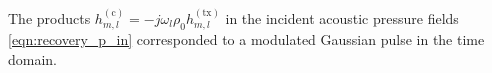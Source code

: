 %
%
%
%
The products
$h_{m, l}^{(\text{c})} = -j \omega_{l} \rho_{0} h_{m, l}^{(\text{tx})}$ in
the incident acoustic pressure fields
\eqref{eqn:recovery_p_in} corresponded to
a modulated Gaussian pulse in
the time domain.
